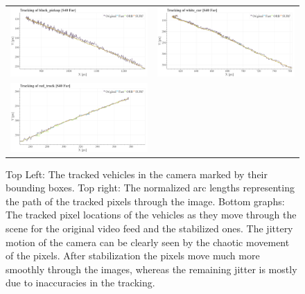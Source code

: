\begin{figure}[!ht]
\begin{tabular}{cc}
    \includegraphics[width=0.475\linewidth]{diagrams/object_tracking/s40_n_far/black_pickup.png}    &  
    \includegraphics[width=0.475\linewidth]{diagrams/object_tracking/s40_n_far/white_car.png}    \\  
    \includegraphics[width=0.475\linewidth]{diagrams/object_tracking/s40_n_far/red_truck.png}   
  \end{tabular}
  \caption{Top Left:
  The tracked vehicles in the camera  marked by their bounding boxes. 
  Top right: 
  The normalized arc lengths representing the path of the tracked pixels through the image.
  Bottom graphs:
  The tracked pixel locations of the vehicles as they move through the scene for the original video feed and the stabilized ones.
  The jittery motion of the camera can be clearly seen by the chaotic movement of the pixels.
  After stabilization the pixels move much more smoothly through the images, whereas the remaining jitter is mostly due to inaccuracies in the tracking. 
  }
  \label{fig:object_tracking_appendix_s40_n_far}
\end{figure}



